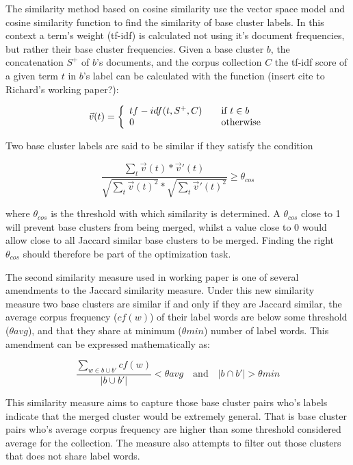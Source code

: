 The similarity method based on cosine similarity use the vector space model and cosine similarity function to find the similarity of base cluster labels. In this context a term's weight (tf-idf) is calculated not using it's document frequencies, but rather their base cluster frequencies. Given a base cluster \(b\), the concatenation \(S^+\) of \(b\)'s documents, and the corpus collection \(C\) the tf-idf score of a given term \(t\) in \(b\)'s label can be calculated with the function (insert cite to Richard's working paper?):

\begin{displaymath}
\vec{v}(t) = \left\{
  \begin{array}{l l}
    tf-idf(t, S^+, C) & \quad \text{if $t \in b$}\\
    0 & \quad \text{otherwise}
  \end{array} \right.
\end{displaymath}

Two base cluster labels are said to be similar if they satisfy the condition

\begin{displaymath}
\frac{\sum_{t}\vec{v}(t) * \vec{v}'(t)}
{\sqrt{\sum_{t}\vec{v}(t)^2} * \sqrt{\sum_{t}\vec{v}'(t)^2}}
\ge \theta_{cos}
\end{displaymath}

where \(\theta_{cos}\) is the threshold with which similarity is determined. A \(\theta_{cos}\) close to 1 will prevent base clusters from being merged, whilst a value close to 0 would allow close to all Jaccard similar base clusters to be merged. Finding the right \(\theta_{cos}\) should therefore be part of the optimization task.

The second similarity measure used in \supervisor working paper is one of several amendments to the Jaccard similarity measure. Under this new similarity measure two base clusters are similar if and only if they are Jaccard similar, the average corpus frequency (\(cf(w)\)) of their label words are below some threshold (\(\theta avg\)), and that they share at minimum (\(\theta min\)) number of label words. This amendment can be expressed mathematically as:

\begin{displaymath}
\frac{\sum\limits_{w \in b \cup b'} cf(w)}{\vert b \cup b' \vert} < \theta avg \quad \text{and} \quad \vert b \cap b' \vert > \theta min
\end{displaymath}

This similarity measure aims to capture those base cluster pairs who's labels indicate that the merged cluster would be extremely general. That is base cluster pairs who's average corpus frequency are higher than some threshold considered average for the collection. The measure also attempts to filter out those clusters that does not share label words.

